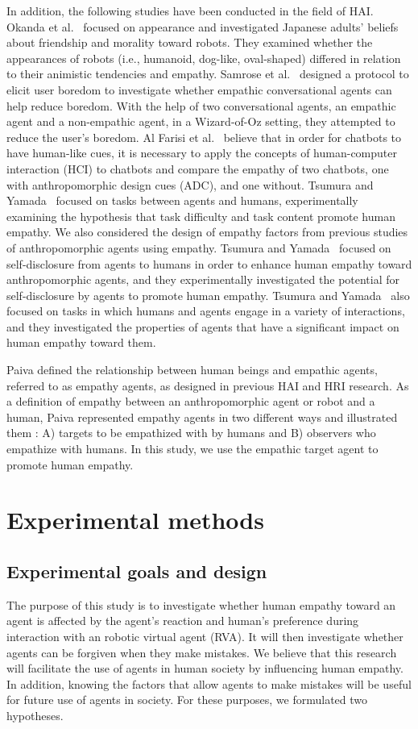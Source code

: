 \documentclass[runningheads]{llncs}
\begin{document}
In addition, the following studies have been conducted in the field of HAI. 
Okanda et al.~\cite{Okanda19} focused on appearance and investigated Japanese adults' beliefs about friendship and morality toward robots. 
They examined whether the appearances of robots (i.e., humanoid, dog-like, oval-shaped) differed in relation to their animistic tendencies and empathy. 
Samrose et al.~\cite{Samrose20} designed a protocol to elicit user boredom to investigate whether empathic conversational agents can help reduce boredom. 
With the help of two conversational agents, an empathic agent and a non-empathic agent, in a Wizard-of-Oz setting, they attempted to reduce the user's boredom. 
Al Farisi et al.~\cite{Al-Farisi22} believe that in order for chatbots to have human-like cues, it is necessary to apply the concepts of human-computer interaction (HCI) to chatbots and compare the empathy of two chatbots, one with anthropomorphic design cues (ADC), and one without. 
Tsumura and Yamada~\cite{Tsumura22} focused on tasks between agents and humans, experimentally examining the hypothesis that task difficulty and task content promote human empathy.
We also considered the design of empathy factors from previous studies of anthropomorphic agents using empathy. 
Tsumura and Yamada~\cite{Tsumura23-1} focused on self-disclosure from agents to humans in order to enhance human empathy toward anthropomorphic agents, and they experimentally investigated the potential for self-disclosure by agents to promote human empathy. 
Tsumura and Yamada~\cite{Tsumura23-2} also focused on tasks in which humans and agents engage in a variety of interactions, and they investigated the properties of agents that have a significant impact on human empathy toward them. 

Paiva defined the relationship between human beings and empathic agents, referred to as empathy agents, as designed in previous HAI and HRI research. 
As a definition of empathy between an anthropomorphic agent or robot and a human, Paiva represented empathy agents in two different ways and illustrated them \cite{Paiva04,Paiva11,Paiva17}: A) targets to be empathized with by humans and B) observers who empathize with humans. 
In this study, we use the empathic target agent to promote human empathy.

\section{Experimental methods}
\subsection{Experimental goals and design}
The purpose of this study is to investigate whether human empathy toward an agent is affected by the agent's reaction and human's preference during interaction with an robotic virtual agent (RVA).
It will then investigate whether agents can be forgiven when they make mistakes.
We believe that this research will facilitate the use of agents in human society by influencing human empathy.
In addition, knowing the factors that allow agents to make mistakes will be useful for future use of agents in society.
For these purposes, we formulated two hypotheses.
\end{document}
